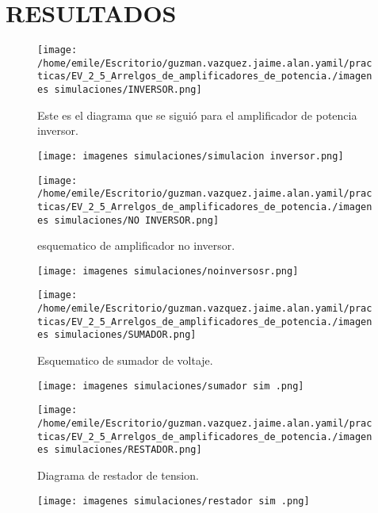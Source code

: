 \documentclass[13pt]{article}
\begin{document}
\section{RESULTADOS}
\begin{figure}[htp]
\centering
\texttt{[image: /home/emile/Escritorio/guzman.vazquez.jaime.alan.yamil/practicas/EV\_2\_5\_Arrelgos\_de\_amplificadores\_de\_potencia./imagenes simulaciones/INVERSOR.png]}
\caption{Este es el diagrama que se siguió para el amplificador de potencia inversor.}
\label{.}

\end{figure}
\begin{figure}[htp]
\centering
\texttt{[image: imagenes simulaciones/simulacion inversor.png]}
\caption{}
\label{}
\end{figure}

\begin{figure}[htp]
\centering
\texttt{[image: /home/emile/Escritorio/guzman.vazquez.jaime.alan.yamil/practicas/EV\_2\_5\_Arrelgos\_de\_amplificadores\_de\_potencia./imagenes simulaciones/NO INVERSOR.png]}
\caption{esquematico de amplificador no inversor.}
\label{.}
\end{figure}

\begin{figure}[htp]
\centering
\texttt{[image: imagenes simulaciones/noinversosr.png]}
\caption{}
\label{}
\end{figure}

\begin{figure}[htp]
\centering
\texttt{[image: /home/emile/Escritorio/guzman.vazquez.jaime.alan.yamil/practicas/EV\_2\_5\_Arrelgos\_de\_amplificadores\_de\_potencia./imagenes simulaciones/SUMADOR.png]}
\caption{Esquematico de sumador de voltaje.}
\label{.}
\end{figure}

\begin{figure}[htp]
\centering
\texttt{[image: imagenes simulaciones/sumador sim .png]}
\caption{}
\label{}
\end{figure}

\begin{figure}[htp]
\centering
\texttt{[image: /home/emile/Escritorio/guzman.vazquez.jaime.alan.yamil/practicas/EV\_2\_5\_Arrelgos\_de\_amplificadores\_de\_potencia./imagenes simulaciones/RESTADOR.png]}
\caption{Diagrama de restador de tension.}
\label{.}
\end{figure}

\begin{figure}[htp]
\centering
\texttt{[image: imagenes simulaciones/restador sim .png]}
\caption{}
\label{}
\end{figure}
\end{document}
